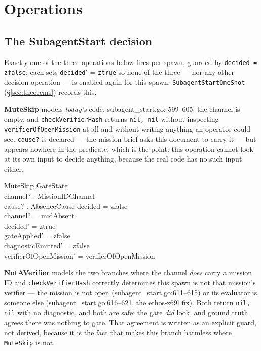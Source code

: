 \documentclass[a4paper,10pt,fleqn]{article}
\newcommand{\field}[1]{\texttt{#1}}
\begin{document}
\section{Operations}
\label{sec:ops}

\subsection{The SubagentStart decision}
\label{sec:decision}

Exactly one of the three operations below fires per spawn, guarded by
\field{decided = zfalse}; each sets \field{decided}$'$ =
\field{ztrue} so none of the three --- nor any other decision
operation --- is enabled again for this spawn.
\field{SubagentStartOneShot} (\S\ref{sec:theorems}) records this.

\textbf{MuteSkip} models \emph{today's} code, subagent\_start.go:
599--605: the channel is empty, and \field{checkVerifierHash}
returns \field{nil, nil} without inspecting
\field{verifierOfOpenMission} at all and without writing anything an
operator could see. \field{cause?} is declared --- the mission brief
asks this document to carry it --- but appears nowhere in the
predicate, which is the point: this operation cannot look at its own
input to decide anything, because the real code has no such input
either.

\begin{schema}{MuteSkip}
\Delta GateState \\
channel? : MissionIDChannel \\
cause? : AbsenceCause
\where
decided = zfalse \\
channel? = midAbsent \\
decided' = ztrue \\
gateApplied' = zfalse \\
diagnosticEmitted' = zfalse \\
verifierOfOpenMission' = verifierOfOpenMission
\end{schema}

\textbf{NotAVerifier} models the two branches where the channel
\emph{does} carry a mission ID and \field{checkVerifierHash} correctly
determines this spawn is not that mission's verifier --- the mission
is not open (subagent\_start.go:611--615) or its evaluator is someone
else (subagent\_start.go:616--621, the ethos-z69l fix). Both return
\field{nil, nil} with no diagnostic, and both are safe: the gate
\emph{did} look, and ground truth agrees there was nothing to gate.
That agreement is written as an explicit guard, not derived, because
it is the fact that makes this branch harmless where
\field{MuteSkip} is not.
\end{document}
